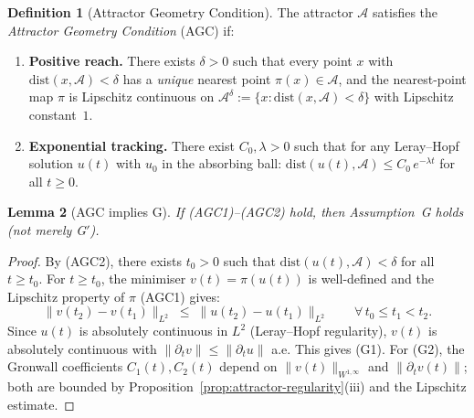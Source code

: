 \documentclass[12pt,a4paper]{article}
\theoremstyle{definition}
\newtheorem{definition}{Definition}[section]
\theoremstyle{plain}
\newtheorem{lemma}[definition]{Lemma}
\theoremstyle{remark}
\begin{document}
\begin{definition}[Attractor Geometry Condition]\label{def:AGC}
The attractor $\mathcal{A}$ satisfies the \emph{Attractor Geometry
Condition} (AGC) if:
\begin{enumerate}
  \item[\textup{(AGC1)}] \textbf{Positive reach.}\;
    There exists $\delta > 0$ such that every point $x$ with
    $\mathrm{dist}(x, \mathcal{A}) < \delta$ has a \emph{unique}
    nearest point $\pi(x) \in \mathcal{A}$, and the nearest-point map
    $\pi$ is Lipschitz continuous on
    $\mathcal{A}^\delta := \{x : \mathrm{dist}(x,\mathcal{A}) < \delta\}$
    with Lipschitz constant~$1$.
  \item[\textup{(AGC2)}] \textbf{Exponential tracking.}\;
    There exist $C_0, \lambda > 0$ such that for any Leray--Hopf solution
    $u(t)$ with $u_0$ in the absorbing ball:
    $\mathrm{dist}(u(t), \mathcal{A}) \le C_0\,e^{-\lambda t}$ for all
    $t \ge 0$.
\end{enumerate}
\end{definition}

\begin{lemma}[AGC implies G]\label{lem:AGC-implies-G}
If \textup{(AGC1)--(AGC2)} hold, then Assumption~G holds
\textup{(}not merely G$'$\textup{)}.
\end{lemma}

\begin{proof}
By (AGC2), there exists $t_0 > 0$ such that
$\mathrm{dist}(u(t), \mathcal{A}) < \delta$ for all $t \ge t_0$.
For $t \ge t_0$, the minimiser $v(t) = \pi(u(t))$ is well-defined and
the Lipschitz property of $\pi$ (AGC1) gives:
\[
  \|v(t_2) - v(t_1)\|_{L^2}
  \;\le\;
  \|u(t_2) - u(t_1)\|_{L^2}
  \qquad \forall\, t_0 \le t_1 < t_2.
\]
Since $u(t)$ is absolutely continuous in $L^2$ (Leray--Hopf regularity),
$v(t)$ is absolutely continuous with $\|\partial_t v\| \le \|\partial_t u\|$
a.e. This gives (G1). For (G2), the Gronwall coefficients $C_1(t),
C_2(t)$ depend on $\|v(t)\|_{W^{1,\infty}}$ and $\|\partial_t v(t)\|$;
both are bounded by
Proposition~\ref{prop:attractor-regularity}(iii) and the Lipschitz
estimate.
\end{proof}
\end{document}
